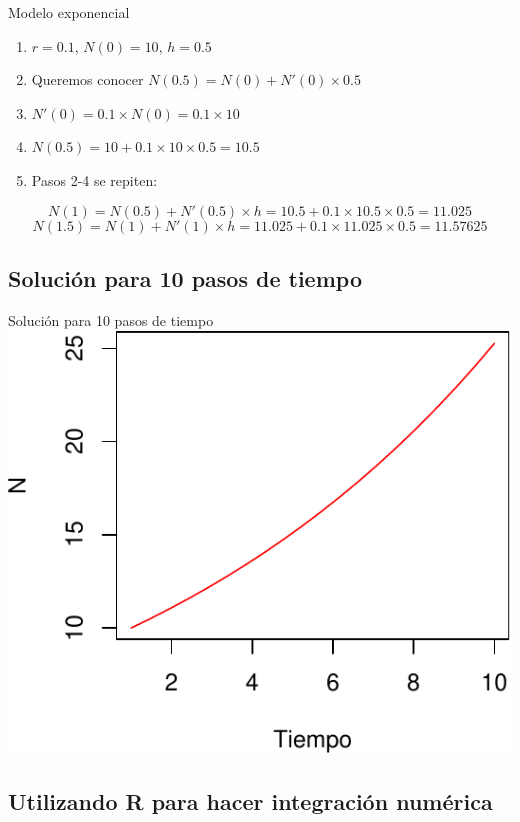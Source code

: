 \documentclass[
  11pt,
  ignorenonframetext,
]{beamer}
\begin{document}
\begin{frame}{Modelo exponencial}
\begin{enumerate}
\item
  \(r = 0.1\), \(N(0) = 10\), \(h = 0.5\)
\item
  Queremos conocer \(N(0.5) = N(0) + N'(0) \times 0.5\)
\item
  \(N'(0) = 0.1 \times N(0) = 0.1 \times 10\)
\item
  \(N(0.5) = 10 + 0.1 \times 10 \times 0.5 = 10.5\)
\item
  Pasos 2-4 se repiten:
\end{enumerate}

\[N(1) = N(0.5) + N'(0.5) \times h = 10.5 + 0.1\times 10.5 \times 0.5 = 11.025\]
\[N(1.5) = N(1) + N'(1) \times h = 11.025 + 0.1\times 11.025 \times 0.5 = 11.57625\]
\end{frame}

\hypertarget{soluciuxf3n-para-10-pasos-de-tiempo}{%
\subsection{Solución para 10 pasos de
tiempo}\label{soluciuxf3n-para-10-pasos-de-tiempo}}

\begin{frame}{Solución para 10 pasos de tiempo}
\includegraphics{Modelos-meta_files/figure-beamer/unnamed-chunk-1-1.pdf}
\end{frame}

\hypertarget{utilizando-r-para-hacer-integraciuxf3n-numuxe9rica}{%
\subsection{Utilizando R para hacer integración
numérica}\label{utilizando-r-para-hacer-integraciuxf3n-numuxe9rica}}
\end{document}
